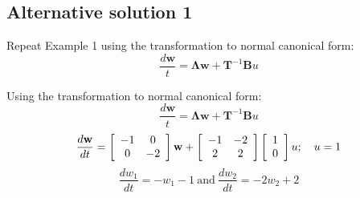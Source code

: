 \subsection*{Alternative solution 1}
\ifslidesonly
\begin{slide}
Repeat Example 1 using the transformation to normal canonical form:
\[
\frac{d\mathbf{w}}{t}=\mathbf{\Lambda w}+ \mathbf{T}^{-1}\mathbf{B}u
\]
\end{slide}
\fi
Using the transformation to normal canonical form:
\[
\frac{d\mathbf{w}}{t}=\mathbf{\Lambda w}+ \mathbf{T}^{-1}\mathbf{B}u
\]
\[
\frac{{d{\bf{w}}}}{{dt}} = \left[ {\begin{array}{*{20}c}
   { - 1} & 0  \\
   0 & { - 2}  \\
\end{array}} \right]{\bf{w}} + \left[ {\begin{array}{*{20}c}
   { - 1} & { - 2}  \\
   2 & 2  \\
\end{array}} \right]\left[ {\begin{array}{*{20}c}
   1  \\
   0  \\
\end{array}} \right]u;\quad u = 1
\]
\[
\frac{dw_1}{dt}=-w_1-1\ \textrm{and}\ \frac{dw_2}{dt}=-2w_2 + 2
\]
